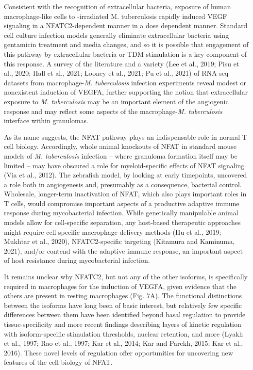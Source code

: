 Consistent with the recognition of extracellular bacteria, exposure of human macrophage-like cells to \textgamma-irradiated M. tuberculosis rapidly induced VEGF signaling in a NFATC2-dependent manner in a dose dependent manner. Standard cell culture infection models generally eliminate extracellular bacteria using gentamicin treatment and media changes, and so it is possible that engagement of this pathway by extracellular bacteria or TDM stimulation is a key component of this response. A survey of the literature and a variety (Lee et al., 2019; Pisu et al., 2020; Hall et al., 2021; Looney et al., 2021; Pu et al., 2021) of RNA-seq datasets from macrophage-\textit{M. tuberculosis} infection experiments reveal modest or nonexistent induction of VEGFA, further supporting the notion that extracellular exposure to \textit{M. tuberculosis} may be an important element of the angiogenic response and may reflect some aspects of the macrophage-\textit{M. tuberculosis} interface within granulomas.

As its name suggests, the NFAT pathway plays an indispensable role in normal T cell biology. Accordingly, whole animal knockouts of NFAT in standard mouse models of \textit{M. tuberculosis} infection -- where granuloma formation itself may be limited -- may have obscured a role for myeloid-specific effects of NFAT signaling (Via et al., 2012). The zebrafish model, by looking at early timepoints, uncovered a role both in angiogenesis and, presumably as a consequence, bacterial control. Wholesale, longer-term inactivation of NFAT, which also plays important roles in T cells, would compromise important aspects of a productive adaptive immune response during mycobacterial infection. While genetically manipulable animal models allow for cell-specific separation, any host-based therapeutic approaches might require cell-specific macrophage delivery methods (Hu et al., 2019; Mukhtar et al., 2020), NFATC2-specific targeting (Kitamura and Kaminuma, 2021), and/or contend with the adaptive immune response, an important aspect of host resistance during mycobacterial infection.

It remains unclear why NFATC2, but not any of the other isoforms, is specifically required in macrophages for the induction of VEGFA, given evidence that the others are present in resting macrophages (Fig. 7A). The functional distinctions between the isoforms have long been of basic interest, but relatively few specific differences between them have been identified beyond basal regulation to provide tissue-specificity and more recent findings describing layers of kinetic regulation with isoform-specific stimulation thresholds, nuclear retention, and more (Lyakh et al., 1997; Rao et al., 1997; Kar et al., 2014; Kar and Parekh, 2015; Kar et al., 2016). These novel levels of regulation offer opportunities for uncovering new features of the cell biology of NFAT.

